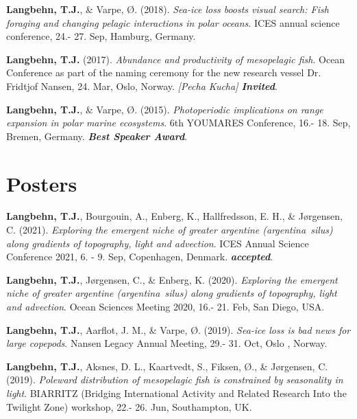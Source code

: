 \documentclass[11pt, a4paper]{awesome-cv}
\begin{document}
\leavevmode\hypertarget{ref-Langbehn3}{}%
\textbf{Langbehn, T.J.}, \& Varpe, Ø. (2018). \emph{Sea-ice loss boosts
visual search: Fish foraging and changing pelagic interactions in polar
oceans}. ICES annual science conference, 24.- 27. Sep, Hamburg, Germany.

\leavevmode\hypertarget{ref-Langbehn2}{}%
\textbf{Langbehn, T.J.} (2017). \emph{Abundance and productivity of
mesopelagic fish}. Ocean Conference as part of the naming ceremony for
the new research vessel Dr. Fridtjof Nansen, 24. Mar, Oslo, Norway.
\emph{{[}Pecha Kucha{]} \textbf{Invited}}.

\leavevmode\hypertarget{ref-Langbehn1}{}%
\textbf{Langbehn, T.J.}, \& Varpe, Ø. (2015). \emph{Photoperiodic
implications on range expansion in polar marine ecosystems}. 6th
YOUMARES Conference, 16.- 18. Sep, Bremen, Germany. \emph{\textbf{Best
Speaker Award}}.

\endgroup

\hypertarget{posters}{%
\section{Posters}\label{posters}}

\begingroup
\setlength{\parindent}{-0.5in}
\setlength{\leftskip}{0.5in}

\hypertarget{refs_posters}{}
\leavevmode\hypertarget{ref-Langbehn13}{}%
\textbf{Langbehn, T.J.}, Bourgouin, A., Enberg, K., Hallfredsson, E. H.,
\& Jørgensen, C. (2021). \emph{Exploring the emergent niche of greater
argentine (argentina~silus) along gradients of topography, light and
advection}. ICES Annual Science Conference 2021, 6. - 9. Sep,
Copenhagen, Denmark. \emph{\textbf{accepted}}.

\leavevmode\hypertarget{ref-Langbehn12}{}%
\textbf{Langbehn, T.J.}, Jørgensen, C., \& Enberg, K. (2020).
\emph{Exploring the emergent niche of greater argentine
(argentina~silus) along gradients of topography, light and advection}.
Ocean Sciences Meeting 2020, 16.- 21. Feb, San Diego, USA.

\leavevmode\hypertarget{ref-Langbehn11}{}%
\textbf{Langbehn, T.J.}, Aarflot, J. M., \& Varpe, Ø. (2019).
\emph{Sea-ice loss is bad news for large copepods}. Nansen Legacy Annual
Meeting, 29.- 31. Oct, Oslo , Norway.

\leavevmode\hypertarget{ref-Langbehn10}{}%
\textbf{Langbehn, T.J.}, Aksnes, D. L., Kaartvedt, S., Fiksen, Ø., \&
Jørgensen, C. (2019). \emph{Poleward distribution of mesopelagic fish is
constrained by seasonality in light}. BIARRITZ (Bridging International
Activity and Related Research Into the Twilight Zone) workshop, 22.- 26.
Jun, Southampton, UK.
\end{document}
